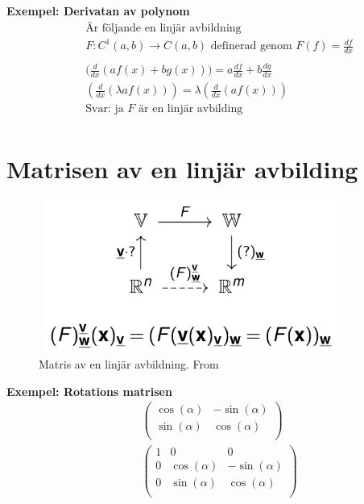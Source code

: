 \textbf{Exempel: Derivatan av polynom}
\begin{align*}
  &\quad  \text{Är följande en linjär avbildning } \\
  &\quad  F:C^1(a,b)\to{C}(a,b) \text{ definerad genom } F(f)=\frac{df}{dx}  \\
  &\quad  \\
  &\quad  \big( \frac{d}{dx}(af(x) + bg(x)) \big) = a\frac{df}{dx} + b\frac{dg}{dx} \\
  &\quad  ( \frac{d}{dx}(\lambda af(x)) ) = \lambda  ( \frac{d}{dx}(af(x)) ) \\
  &\quad  \text{Svar: ja $F$ är en linjär avbilding} \\
\end{align*}


\section{Matrisen av en linjär avbilding}
\begin{figure}[h]
    \vspace{10mm}
    \centering
    \includegraphics[width=10cm, height=5cm]{image/matris_lin_avb.png} 
    \caption{Matris av en linjär avbildning. From \cite{}}
\end{figure}

\textbf{Exempel: Rotations matrisen}
\begin{align*}
  &\quad
  \left(\begin{array}{cc}
    \cos(\alpha) & -\sin(\alpha)   \\
    \sin(\alpha) &  \cos(\alpha)   \\
  \end{array}\right)  \\
  &\quad
  \left(\begin{array}{ccc}
    1 & 0            & 0               \\
    0 & \cos(\alpha) & -\sin(\alpha)   \\
    0 & \sin(\alpha) &  \cos(\alpha)   \\
  \end{array}\right)  \\
\end{align*}


